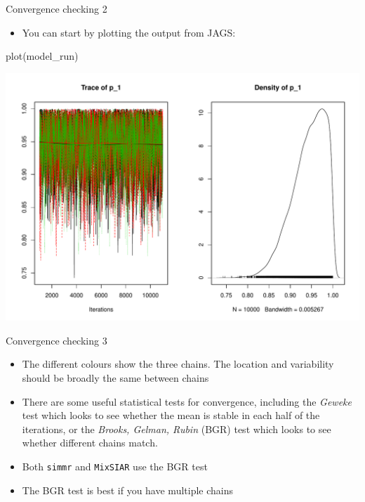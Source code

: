 \documentclass[
  ignorenonframetext,
  aspectratio=169]{beamer}
\newenvironment{Shaded}{\begin{snugshade}}{\end{snugshade}}
\newcommand{\FunctionTok}[1]{\textcolor[rgb]{0.00,0.00,0.00}{#1}}
\newcommand{\NormalTok}[1]{#1}
\providecommand{\tightlist}{%
  \setlength{\itemsep}{0pt}\setlength{\parskip}{0pt}}
\begin{document}
\begin{frame}[fragile]{Convergence checking 2}
\protect\hypertarget{convergence-checking-2}{}
\begin{itemize}
\tightlist
\item
  You can start by plotting the output from JAGS:
\end{itemize}

\begin{Shaded}
\begin{Highlighting}[]
\FunctionTok{plot}\NormalTok{(model\_run)}
\end{Highlighting}
\end{Shaded}

\begin{center}\includegraphics{reg_and_simms_files/figure-beamer/unnamed-chunk-17-1} \end{center}
\end{frame}

\begin{frame}[fragile]{Convergence checking 3}
\protect\hypertarget{convergence-checking-3}{}
\begin{itemize}
\tightlist
\item
  The different colours show the three chains. The location and
  variability should be broadly the same between chains
\item
  There are some useful statistical tests for convergence, including the
  \emph{Geweke} test which looks to see whether the mean is stable in
  each half of the iterations, or the \emph{Brooks, Gelman, Rubin} (BGR)
  test which looks to see whether different chains match.
\item
  Both \texttt{simmr} and \texttt{MixSIAR} use the BGR test
\item
  The BGR test is best if you have multiple chains
\end{itemize}
\end{frame}
\end{document}
